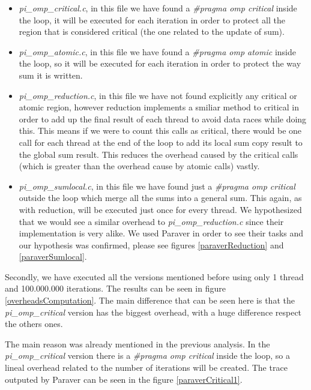 \documentclass[12]{article}
\begin{document}
\begin{itemize}
\item  \textit{pi\_omp\_critical.c}, in this file we have found a \textit{\#pragma omp critical} inside the loop, it will be executed for each iteration in order to protect all the region that is considered critical (the one related to the update of sum).
\item  \textit{pi\_omp\_atomic.c}, in this file we have found a \textit{\#pragma omp atomic} inside the loop, so it will be executed for each iteration in order to protect the way sum it is written. 
\item  \textit{pi\_omp\_reduction.c}, in this file we have not found explicitly any critical or atomic region, however reduction implements a smiliar method to critical in order to add up the final result of each thread to avoid data races while doing this. This means if we were to count this calls as critical, there would be one call for each thread at the end of the loop to add its local sum copy result to the global sum result. This reduces the overhead caused by the critical calls (which is greater than the overhead cause by atomic calls) vastly. 
\item  \textit{pi\_omp\_sumlocal.c}, in this file we have found just a \textit{\#pragma omp critical} outside the loop which merge all the sums into a general sum. This again, as with reduction, will be executed just once for every thread. We hypothesized that we would see a similar overhead to \textit{pi\_omp\_reduction.c} since their implementation is very alike. We used Paraver in order to see their tasks and our hypothesis was confirmed, please see figures \ref{paraverReduction} and \ref{paraverSumlocal}. 
\end{itemize}



Secondly, we have executed all the versions mentioned before using only 1 thread and 100.000.000 iterations. The results can be seen in figure \ref{overheadsComputation}. The main difference that can be seen here is that the \textit{pi\_omp\_critical} version has the biggest overhead, with a huge difference respect the others ones.

The main reason was already mentioned in the previous analysis. In the \textit{pi\_omp\_critical} version there is a \textit{\#pragma omp critical} inside the loop, so a lineal overhead related to the number of iterations will be created. The trace outputed by Paraver can be seen in the figure \ref{paraverCritical1}. 
\end{document}
